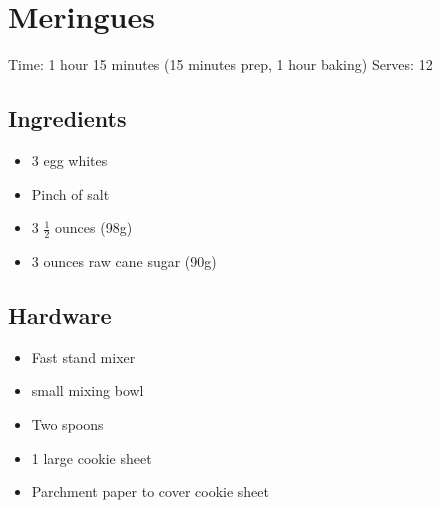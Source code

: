 \section{Meringues}
\label{meringues}
\setcounter{secnumdepth}{0}
Time: 1 hour 15 minutes (15 minutes prep, 1 hour baking)
Serves: 12

\begin{multicols}{2}
\subsection*{Ingredients}
\begin{itemize}
    \item 3 egg whites
    \item Pinch of salt
    \item 3 \( \frac{1}{2} \) ounces  (98g)
    \item 3 ounces raw cane sugar (90g)
\end{itemize}

\subsection*{Hardware}
\begin{itemize}
    \item Fast stand mixer
    \item small mixing bowl
    \item Two spoons
    \item 1 large cookie sheet
    \item Parchment paper to cover cookie sheet
\end{itemize}
\clearpage


\end{multicols}
